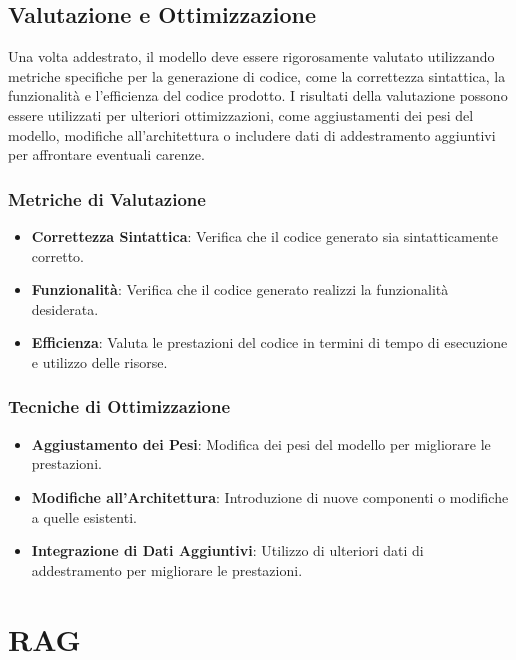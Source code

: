 \documentclass[12pt,a4paper,openright,twoside]{book}
\begin{document}
\section{Valutazione e Ottimizzazione}
Una volta addestrato, il modello deve essere rigorosamente valutato utilizzando metriche specifiche per la generazione di codice, come la correttezza sintattica, la funzionalità e l'efficienza del codice prodotto.
I risultati della valutazione possono essere utilizzati per ulteriori ottimizzazioni, come aggiustamenti dei pesi del modello, modifiche all'architettura o includere dati di addestramento aggiuntivi per affrontare eventuali carenze.

\subsection{Metriche di Valutazione}
\begin{itemize}
    \item \textbf{Correttezza Sintattica}: Verifica che il codice generato sia sintatticamente corretto.
    \item \textbf{Funzionalità}: Verifica che il codice generato realizzi la funzionalità desiderata.
    \item \textbf{Efficienza}: Valuta le prestazioni del codice in termini di tempo di esecuzione e utilizzo delle risorse.
\end{itemize}

\subsection{Tecniche di Ottimizzazione}
\begin{itemize}
    \item \textbf{Aggiustamento dei Pesi}: Modifica dei pesi del modello per migliorare le prestazioni.
    \item \textbf{Modifiche all'Architettura}: Introduzione di nuove componenti o modifiche a quelle esistenti.
    \item \textbf{Integrazione di Dati Aggiuntivi}: Utilizzo di ulteriori dati di addestramento per migliorare le prestazioni.
\end{itemize}

\chapter{RAG}
\end{document}
